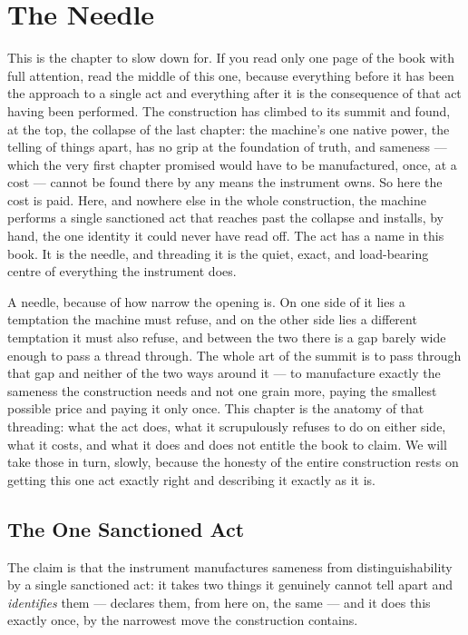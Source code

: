 \chapter{The Needle}

This is the chapter to slow down for. If you read only one page of the book with full attention, read the middle
of this one, because everything before it has been the approach to a single act and everything after it is the
consequence of that act having been performed. The construction has climbed to its summit and found, at the top,
the collapse of the last chapter: the machine's one native power, the telling of things apart, has no grip at the
foundation of truth, and sameness --- which the very first chapter promised would have to be manufactured, once,
at a cost --- cannot be found there by any means the instrument owns. So here the cost is paid. Here, and nowhere
else in the whole construction, the machine performs a single sanctioned act that reaches past the collapse and
installs, by hand, the one identity it could never have read off. The act has a name in this book. It is the
needle, and threading it is the quiet, exact, and load-bearing centre of everything the instrument does.

A needle, because of how narrow the opening is. On one side of it lies a temptation the machine must refuse, and
on the other side lies a different temptation it must also refuse, and between the two there is a gap barely wide
enough to pass a thread through. The whole art of the summit is to pass through that gap and neither of the two
ways around it --- to manufacture exactly the sameness the construction needs and not one grain more, paying the
smallest possible price and paying it only once. This chapter is the anatomy of that threading: what the act does,
what it scrupulously refuses to do on either side, what it costs, and what it does and does not entitle the book
to claim. We will take those in turn, slowly, because the honesty of the entire construction rests on getting this
one act exactly right and describing it exactly as it is.

\section{The One Sanctioned Act}

The claim is that the instrument manufactures sameness from distinguishability by a single sanctioned act: it
takes two things it genuinely cannot tell apart and \emph{identifies} them --- declares them, from here on, the
same --- and it does this exactly once, by the narrowest move the construction contains.

